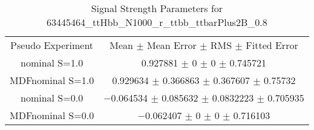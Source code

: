 \begin{table}
\centering
\caption{Signal Strength Parameters for 63445464\_ttHbb\_N1000\_r\_ttbb\_ttbarPlus2B\_0.8}
\begin{tabular}{cc}
\toprule
Pseudo Experiment & Mean $\pm$ Mean Error $\pm$ RMS $\pm$ Fitted Error\\
nominal S=1.0 & \num{0.927881} $\pm$ \num{0} $\pm$ \num{0} $\pm$ \num{0.745721}\\
MDFnominal S=1.0 & \num{0.929634} $\pm$ \num{0.366863} $\pm$ \num{0.367607} $\pm$ \num{0.75732}\\
nominal S=0.0 & \num{-0.064534} $\pm$ \num{0.085632} $\pm$ \num{0.0832223} $\pm$ \num{0.705935}\\
MDFnominal S=0.0 & \num{-0.062407} $\pm$ \num{0} $\pm$ \num{0} $\pm$ \num{0.716103}\\
\bottomrule
\end{tabular}
\end{table}